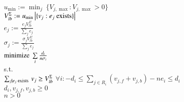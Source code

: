 \begin{AlgFloat}[H]
\begin{Algorithm}[FALCON]
\label{alg:FALCON}
\begin{algorithmic}
~\\
$u_{\min} := \min_j\ \{V_{j,\max} : V_{j,\max} > 0\}$\\
$V_{lb}^{\Sigma} := u_{\min} \left|\{v_j : e_j \textnormal{ exists}\}\right|$\\
  \STATE $e_j := \frac{e_j V_{lb}^{\Sigma}}
    {\sum\limits_{j} e_j}$\\ 
  \STATE $\sigma_j := \frac{\sigma_j V_{lb}^{\Sigma}}
    {\sum\limits_{j} e_j}$\\ 
\ENDFOR
{}
  \INDSTATE $\textnormal{minimize}\ \sum\limits_i \frac{d_i}{n
    \sigma_i}$ \\
  \INDSTATE s.t. \\
  \INDSTATE $\sum_{j \mid e_j \textnormal{ exists }} v_j \geq V_{lb}^{\Sigma}$ 
  \INDSTATE $\forall i: -d_i \leq \sum\nolimits_{j \in R_i} (v_{j,f} +
    v_{j,b}) - n e_i \leq d_i$ \\
  \INDSTATE $d_i, v_{j,f}, v_{j,b} \geq 0$ \\
  \INDSTATE $n > 0$
  \ENDFOR
\ENDWHILE
\end{algorithmic}
\end{Algorithm}
\end{AlgFloat}

